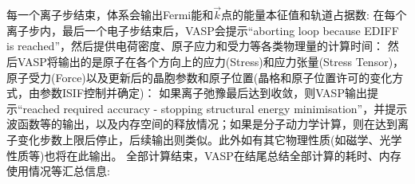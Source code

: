 每一个离子步结束，体系会输出\textrm{Fermi}能和$\vec k$点的能量本征值和轨道占据数:
{\fontsize{8.2pt}{6.2pt}\selectfont{
}}
在每个离子步内，最后一个电子步结束后，\textrm{VASP}会提示``\textrm{aborting loop because EDIFF is reached}''，然后提供电荷密度、原子应力和受力等各类物理量的计算时间：
{\fontsize{8.2pt}{6.2pt}\selectfont{
}}
然后\textrm{VASP}将输出的是原子在各个方向上的应力\textrm{(Stress)}和应力张量\textrm{(Stress Tensor)}，原子受力\textrm{(Force)}以及更新后的晶胞参数和原子位置(晶格和原子位置许可的变化方式，由参数\textrm{ISIF}控制并确定)：
{\fontsize{8.2pt}{6.2pt}\selectfont{
}}
如果离子弛豫最后达到收敛，则\textrm{VASP}输出提示``\textrm{reached required accuracy - stopping structural energy minimisation}''，并提示波函数等的输出，以及内存空间的释放情况；如果是分子动力学计算，则在达到离子变化步数上限后停止，后续输出则类似。此外如有其它物理性质(如磁学、光学性质等)也将在此输出。
{\fontsize{8.2pt}{6.2pt}\selectfont{
}}
全部计算结束，\textrm{VASP}在结尾总结全部计算的耗时、内存使用情况等汇总信息:
{\fontsize{8.2pt}{6.2pt}\selectfont{
}}
%
%
%
%
%
%
%
